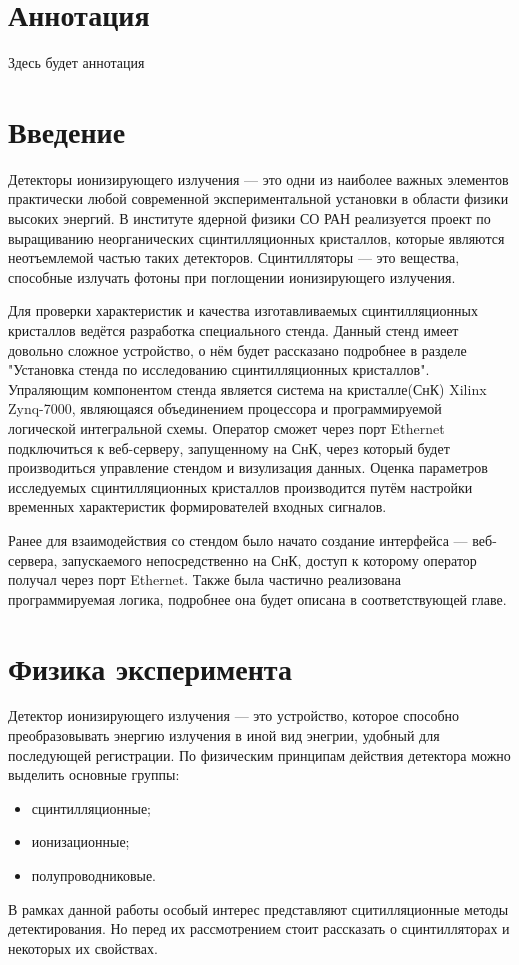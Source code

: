 \documentclass[a4paper, 14pt]{extarticle}
\begin{document}

\section*{Аннотация}
Здесь будет аннотация
\newpage

\tableofcontents
\newpage

\section*{Введение}
Детекторы ионизирующего излучения --- это одни из наиболее важных элементов практически любой современной экспериментальной установки в области физики высоких энергий. В институте ядерной физики СО РАН реализуется проект по выращиванию неорганических сцинтилляционных кристаллов, которые являются неотъемлемой частью таких детекторов. Сцинтилляторы --- это вещества, способные излучать фотоны при поглощении ионизирующего излучения.\par
Для проверки характеристик и качества изготавливаемых сцинтилляционных кристаллов ведётся разработка специального стенда. Данный стенд имеет довольно сложное устройство, о нём будет рассказано подробнее в разделе "Установка стенда по исследованию сцинтилляционных кристаллов". Упраляющим компонентом стенда является система на кристалле(СнК) Xilinx Zynq-7000, являющаяся объединением процессора и программируемой логической интегральной схемы. Оператор сможет через порт Ethernet подключиться к веб-серверу, запущенному на СнК, через который будет производиться управление стендом и визулизация данных. Оценка параметров исследуемых сцинтилляционных кристаллов производится путём настройки временных характеристик формирователей входных сигналов.\par
Ранее для взаимодействия со стендом было начато создание интерфейса --- веб-сервера, запускаемого непосредственно на СнК, доступ к которому оператор получал через порт Ethernet. Также была частично реализована программируемая логика, подробнее она будет описана в соответствующей главе.\par
\newpage
\section{Физика эксперимента}
    Детектор ионизирующего излучения --- это устройство, которое способно преобразовывать энергию излучения в иной вид энегрии, удобный для последующей регистрации. По физическим принципам действия детектора можно выделить основные группы:
    \begin{itemize}
        \item сцинтилляционные;
        \item ионизационные;
        \item полупроводниковые.
    \end{itemize}\par
    В рамках данной работы особый интерес представляют сцитилляционные методы детектирования. Но перед их рассмотрением стоит рассказать о сцинтилляторах и некоторых их свойствах.
\end{document}
